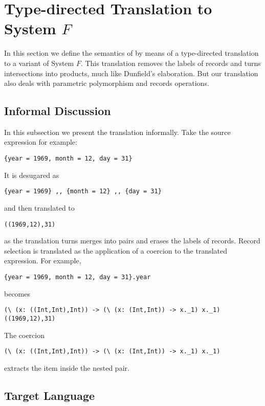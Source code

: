 \section{Type-directed Translation to System $ F $}

In this section we define the semantics of \name by means of a type-directed
translation to a variant of System $F$. This translation removes the labels of
records and turns intersections into products, much like Dunfield's elaboration.
But our translation also deals with parametric polymorphism and records
operations.

\subsection{Informal Discussion}

In this subsection we present the translation informally. Take the source
expression for example:
\begin{lstlisting}
{year = 1969, month = 12, day = 31}
\end{lstlisting}
It is desugared as 
\begin{lstlisting}
{year = 1969} ,, {month = 12} ,, {day = 31}
\end{lstlisting}
and then translated to
\begin{lstlisting}
((1969,12),31)
\end{lstlisting}
as the translation turns merges into pairs and erases the labels of records.
Record selection is translated as the application of a coercion to the
translated expression. For example,
\begin{lstlisting}
{year = 1969, month = 12, day = 31}.year
\end{lstlisting}
becomes
\begin{lstlisting}
(\ (x: ((Int,Int),Int)) -> (\ (x: (Int,Int)) -> x._1) x._1) ((1969,12),31)
\end{lstlisting}
The coercion 
\begin{lstlisting}
(\ (x: ((Int,Int),Int)) -> (\ (x: (Int,Int)) -> x._1) x._1) 
\end{lstlisting}
extracts the item inside the nested pair.



\subsection{Target Language}

